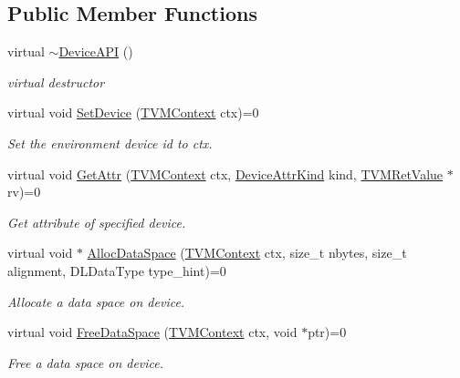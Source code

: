 \subsection*{Public Member Functions}
\begin{DoxyCompactItemize}
\item 
virtual \hyperlink{classtvm_1_1runtime_1_1DeviceAPI_af3fe69d9823d7c67c86ecf247d894f27}{$\sim$\+Device\+A\+PI} ()
\begin{DoxyCompactList}\small\item\em virtual destructor \end{DoxyCompactList}\item 
virtual void \hyperlink{classtvm_1_1runtime_1_1DeviceAPI_a507f3514110b06bb60cb1f2906f8dcf8}{Set\+Device} (\hyperlink{c__runtime__api_8h_a9363bb701f16ce5bbb381f2a013d25b4}{T\+V\+M\+Context} ctx)=0
\begin{DoxyCompactList}\small\item\em Set the environment device id to ctx. \end{DoxyCompactList}\item 
virtual void \hyperlink{classtvm_1_1runtime_1_1DeviceAPI_a2b9effd4264a7e68f12958738d5c676a}{Get\+Attr} (\hyperlink{c__runtime__api_8h_a9363bb701f16ce5bbb381f2a013d25b4}{T\+V\+M\+Context} ctx, \hyperlink{namespacetvm_1_1runtime_a46fef1ca0ccc05473e9bb0a8c6b66619}{Device\+Attr\+Kind} kind, \hyperlink{classtvm_1_1runtime_1_1TVMRetValue}{T\+V\+M\+Ret\+Value} $\ast$rv)=0
\begin{DoxyCompactList}\small\item\em Get attribute of specified device. \end{DoxyCompactList}\item 
virtual void $\ast$ \hyperlink{classtvm_1_1runtime_1_1DeviceAPI_acb8898ee955260b6c4ba0e5bdc4ef124}{Alloc\+Data\+Space} (\hyperlink{c__runtime__api_8h_a9363bb701f16ce5bbb381f2a013d25b4}{T\+V\+M\+Context} ctx, size\+\_\+t nbytes, size\+\_\+t alignment, D\+L\+Data\+Type type\+\_\+hint)=0
\begin{DoxyCompactList}\small\item\em Allocate a data space on device. \end{DoxyCompactList}\item 
virtual void \hyperlink{classtvm_1_1runtime_1_1DeviceAPI_af547b5ab8be9b0f2616aed7e453e067f}{Free\+Data\+Space} (\hyperlink{c__runtime__api_8h_a9363bb701f16ce5bbb381f2a013d25b4}{T\+V\+M\+Context} ctx, void $\ast$ptr)=0
\begin{DoxyCompactList}\small\item\em Free a data space on device. \end{DoxyCompactList}\item 

\end{DoxyCompactItemize}
